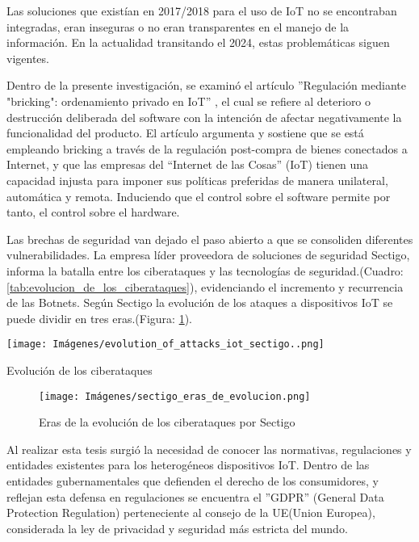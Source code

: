 Las soluciones que existían en 2017/2018 para el uso de IoT no se encontraban integradas, eran inseguras o no eran transparentes en el manejo de la información. En la actualidad transitando el 2024, estas problemáticas siguen vigentes. 

Dentro de la presente investigación, se examinó el artículo ''Regulación mediante "bricking": ordenamiento privado en IoT''\cite{Tusikov2019} , el cual se refiere al deterioro o destrucción deliberada del software con la intención de afectar negativamente la funcionalidad del producto. El artículo argumenta y sostiene que se está empleando bricking a través de la regulación post-compra de bienes conectados a Internet, y que las empresas del “Internet de las Cosas” (IoT) tienen una capacidad injusta para imponer sus políticas preferidas de manera unilateral, automática y remota. Induciendo que el control sobre el software permite por tanto, el control sobre el hardware.

Las brechas de seguridad van dejado el paso abierto a que se consoliden diferentes vulnerabilidades. La empresa líder proveedora de soluciones de seguridad Sectigo, informa la batalla entre los ciberataques y las tecnologías de seguridad.(Cuadro: \ref{tab:evolucion_de_los_ciberataques}), evidenciando el incremento y recurrencia de las Botnets. Según Sectigo la evolución de los ataques a dispositivos IoT se puede dividir en tres eras.(Figura: \ref{fig:sectigo_eras_de_evolucion}).\cite{SectigoNoDate}

\begin{table}[ht]
    \centering
        \texttt{[image: Imágenes/evolution\_of\_attacks\_iot\_sectigo..png]} 
    \caption{Evolución de los ciberataques}
    \label{tab:evolucion_de_los_ciberataques}
\end{table}

\begin{figure}[ht]
    \centering
    \texttt{[image: Imágenes/sectigo\_eras\_de\_evolucion.png]}
    \caption{Eras de la evolución de los ciberataques por Sectigo}
    \label{fig:sectigo_eras_de_evolucion}
\end{figure}

Al realizar esta tesis surgió la necesidad de conocer las normativas, regulaciones y entidades existentes para los heterogéneos dispositivos IoT. Dentro de las entidades gubernamentales que defienden el derecho de los consumidores, y reflejan esta defensa en regulaciones se encuentra el ''GDPR'' (General Data Protection Regulation) perteneciente al consejo de la UE(Union Europea), considerada la ley de privacidad y seguridad más estricta del mundo.\cite{consilium_data_protection}

